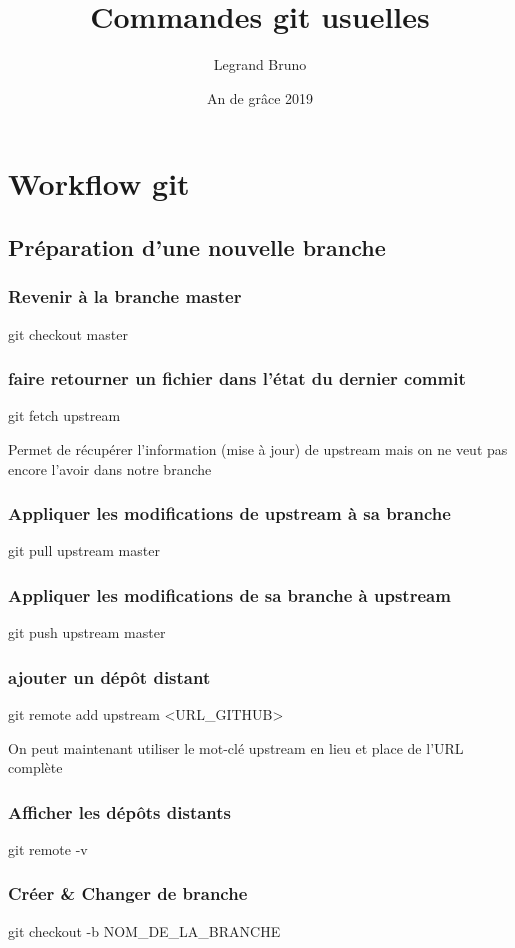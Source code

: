 \documentclass{report}
\title{Commandes git usuelles}
\author{Legrand Bruno}
\date{An de grâce 2019}
\begin{document}
\maketitle

\part{Workflow git}
\chapter{Préparation d'une nouvelle branche}
\section{Revenir à la branche master}
git checkout master

\section{faire retourner un fichier dans l'état du dernier commit}
git fetch upstream

Permet de récupérer l'information (mise à jour) de upstream mais on ne veut pas encore l'avoir dans notre branche

\section{Appliquer les modifications de upstream à sa branche}
git pull upstream master

\section{Appliquer les modifications de sa branche à  upstream}
git push upstream master

\section{ajouter un dépôt distant}
git remote add upstream <URL\_GITHUB>

On peut maintenant utiliser le mot-clé upstream en lieu et place de l'URL complète

\section{Afficher les dépôts distants}
git remote -v


\section{Créer \& Changer de branche}
git checkout -b \og NOM\_DE\_LA\_BRANCHE \fg
\end{document}

